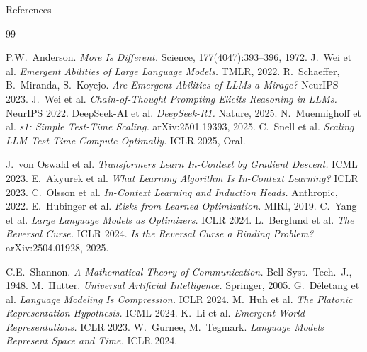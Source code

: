 \documentclass[aspectratio=169, 12pt]{beamer}
\begin{document}
\appendix
\begin{frame}[allowframebreaks]{References}
  \footnotesize
  \begin{thebibliography}{99}

   P.W.\ Anderson.
    \emph{More Is Different.} Science, 177(4047):393--396, 1972.
   J.\ Wei et al.
    \emph{Emergent Abilities of Large Language Models.} TMLR, 2022.
   R.\ Schaeffer, B.\ Miranda, S.\ Koyejo.
    \emph{Are Emergent Abilities of LLMs a Mirage?} NeurIPS 2023.
   J.\ Wei et al.
    \emph{Chain-of-Thought Prompting Elicits Reasoning in LLMs.} NeurIPS 2022.
   DeepSeek-AI et al.
    \emph{DeepSeek-R1.} Nature, 2025.
   N.\ Muennighoff et al.
    \emph{s1: Simple Test-Time Scaling.} arXiv:2501.19393, 2025.
   C.\ Snell et al.
    \emph{Scaling LLM Test-Time Compute Optimally.} ICLR 2025, Oral.

   J.\ von Oswald et al.
    \emph{Transformers Learn In-Context by Gradient Descent.} ICML 2023.
   E.\ Akyurek et al.
    \emph{What Learning Algorithm Is In-Context Learning?} ICLR 2023.
   C.\ Olsson et al.
    \emph{In-Context Learning and Induction Heads.} Anthropic, 2022.
   E.\ Hubinger et al.
    \emph{Risks from Learned Optimization.} MIRI, 2019.
   C.\ Yang et al.
    \emph{Large Language Models as Optimizers.} ICLR 2024.
   L.\ Berglund et al.
    \emph{The Reversal Curse.} ICLR 2024.
   \emph{Is the Reversal Curse a Binding Problem?}
    arXiv:2504.01928, 2025.

   C.E.\ Shannon.
    \emph{A Mathematical Theory of Communication.} Bell Syst.\ Tech.\ J., 1948.
   M.\ Hutter.
    \emph{Universal Artificial Intelligence.} Springer, 2005.
   G.\ D\'{e}letang et al.
    \emph{Language Modeling Is Compression.} ICLR 2024.
   M.\ Huh et al.
    \emph{The Platonic Representation Hypothesis.} ICML 2024.
   K.\ Li et al.
    \emph{Emergent World Representations.} ICLR 2023.
   W.\ Gurnee, M.\ Tegmark.
    \emph{Language Models Represent Space and Time.} ICLR 2024.


\end{thebibliography}
\end{frame}
\end{document}
